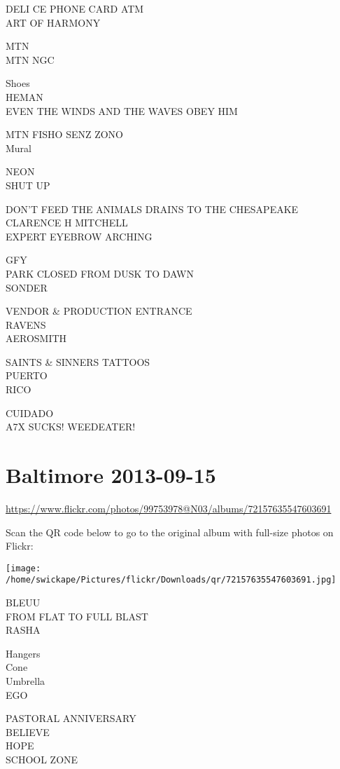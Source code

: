 \documentclass[10pt,letterpaper]{article}
\begin{document}
DELI CE PHONE CARD ATM\\
ART OF HARMONY

MTN\\
MTN NGC

Shoes\\
HEMAN\\
EVEN THE WINDS AND THE WAVES OBEY HIM

MTN FISHO SENZ ZONO\\
Mural

NEON\\
SHUT UP

DON'T FEED THE ANIMALS DRAINS TO THE CHESAPEAKE\\
CLARENCE H MITCHELL\\
EXPERT EYEBROW ARCHING

GFY\\
PARK CLOSED FROM DUSK TO DAWN\\
SONDER

VENDOR \& PRODUCTION ENTRANCE\\
RAVENS\\
AEROSMITH

SAINTS \& SINNERS TATTOOS\\
PUERTO\\
RICO

CUIDADO\\
A7X SUCKS!  WEEDEATER!
\pagebreak

\section*{Baltimore 2013-09-15}

\url{https://www.flickr.com/photos/99753978@N03/albums/72157635547603691}

Scan the QR code below to go to the original album with full-size photos on Flickr:

\texttt{[image: /home/swickape/Pictures/flickr/Downloads/qr/72157635547603691.jpg]}
\pagebreak

BLEUU\\
FROM FLAT TO FULL BLAST\\
RASHA

Hangers\\
Cone\\
Umbrella\\
EGO

PASTORAL ANNIVERSARY\\
BELIEVE\\
HOPE\\
SCHOOL ZONE
\end{document}

